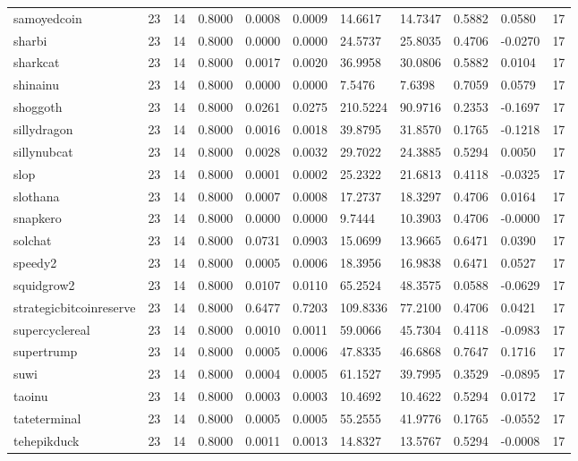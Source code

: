 \begin{table}[htbp]
\begin{tabular}{lllllllllll}
samoyedcoin & 23 & 14 & 0.8000 & 0.0008 & 0.0009 & 14.6617 & 14.7347 & 0.5882 & 0.0580 & 17 \\
sharbi & 23 & 14 & 0.8000 & 0.0000 & 0.0000 & 24.5737 & 25.8035 & 0.4706 & -0.0270 & 17 \\
sharkcat & 23 & 14 & 0.8000 & 0.0017 & 0.0020 & 36.9958 & 30.0806 & 0.5882 & 0.0104 & 17 \\
shinainu & 23 & 14 & 0.8000 & 0.0000 & 0.0000 & 7.5476 & 7.6398 & 0.7059 & 0.0579 & 17 \\
shoggoth & 23 & 14 & 0.8000 & 0.0261 & 0.0275 & 210.5224 & 90.9716 & 0.2353 & -0.1697 & 17 \\
sillydragon & 23 & 14 & 0.8000 & 0.0016 & 0.0018 & 39.8795 & 31.8570 & 0.1765 & -0.1218 & 17 \\
sillynubcat & 23 & 14 & 0.8000 & 0.0028 & 0.0032 & 29.7022 & 24.3885 & 0.5294 & 0.0050 & 17 \\
slop & 23 & 14 & 0.8000 & 0.0001 & 0.0002 & 25.2322 & 21.6813 & 0.4118 & -0.0325 & 17 \\
slothana & 23 & 14 & 0.8000 & 0.0007 & 0.0008 & 17.2737 & 18.3297 & 0.4706 & 0.0164 & 17 \\
snapkero & 23 & 14 & 0.8000 & 0.0000 & 0.0000 & 9.7444 & 10.3903 & 0.4706 & -0.0000 & 17 \\
solchat & 23 & 14 & 0.8000 & 0.0731 & 0.0903 & 15.0699 & 13.9665 & 0.6471 & 0.0390 & 17 \\
speedy2 & 23 & 14 & 0.8000 & 0.0005 & 0.0006 & 18.3956 & 16.9838 & 0.6471 & 0.0527 & 17 \\
squidgrow2 & 23 & 14 & 0.8000 & 0.0107 & 0.0110 & 65.2524 & 48.3575 & 0.0588 & -0.0629 & 17 \\
strategicbitcoinreserve & 23 & 14 & 0.8000 & 0.6477 & 0.7203 & 109.8336 & 77.2100 & 0.4706 & 0.0421 & 17 \\
supercyclereal & 23 & 14 & 0.8000 & 0.0010 & 0.0011 & 59.0066 & 45.7304 & 0.4118 & -0.0983 & 17 \\
supertrump & 23 & 14 & 0.8000 & 0.0005 & 0.0006 & 47.8335 & 46.6868 & 0.7647 & 0.1716 & 17 \\
suwi & 23 & 14 & 0.8000 & 0.0004 & 0.0005 & 61.1527 & 39.7995 & 0.3529 & -0.0895 & 17 \\
taoinu & 23 & 14 & 0.8000 & 0.0003 & 0.0003 & 10.4692 & 10.4622 & 0.5294 & 0.0172 & 17 \\
tateterminal & 23 & 14 & 0.8000 & 0.0005 & 0.0005 & 55.2555 & 41.9776 & 0.1765 & -0.0552 & 17 \\
tehepikduck & 23 & 14 & 0.8000 & 0.0011 & 0.0013 & 14.8327 & 13.5767 & 0.5294 & -0.0008 & 17 \\

\end{tabular}
\end{table}
